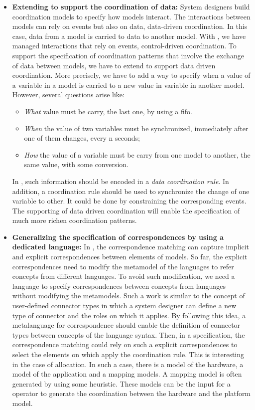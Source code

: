 \begin{itemize}
	\item \textbf{Extending \bcool to support the coordination of data:} System designers build coordination models to specify how models interact. The interactions between models can rely on events but also on data, \ie data-driven coordination. In this case, data from a model is carried to data to another model. With \bcool, we have managed interactions that rely on events, \ie control-driven coordination. To support the specification of coordination patterns that involve the exchange of data between models, we have to extend \bcool to support data driven coordination. More precisely, we have to add a way to specify when a value of a variable in a model is carried to a new value in variable in another model. However, several questions arise like:
			\begin{itemize}
				\item \emph{What} value must be carry, \eg the last one, by using a fifo.
				\item \emph{When} the value of two variables must be synchronized, \eg immediately after one of them changes, every n seconds;
				\item \emph{How} the value of a variable must be carry from one model to another, \eg the same value, with some conversion. 
			\end{itemize}
	In \bcool, such information should be encoded in a \emph{data coordination rule}. In addition, a coordination rule should be used to synchronize the change of one variable to other. It could be done by constraining the corresponding events. The supporting of data driven coordination will enable the specification of much more richen coordination patterns. 	 
	\item \textbf{Generalizing the specification of correspondences by using a dedicated language:} In \bcool, the correspondence matching can capture implicit and explicit correspondences between elements of models. So far, the explicit correspondences need to modify the metamodel of the languages to refer concepts from different languages. To avoid such modification, we need a language to specify correspondences between concepts from languages without modifying the metamodels. Such a work is similar to the concept of user-defined connector types in which a system designer can define a new type of connector and the roles on which it applies. By following this idea, a metalanguage for correspondence should enable the definition of connector types between concepts of the language syntax. Then, in a \bcool specification, the correspondence matching could rely on such a explicit correspondences to select the elements on which apply the coordination rule. This is interesting in the case of allocation. In such a case, there is a model of the hardware, a model of the application and a mapping models. A mapping model is often generated by using some heuristic. These models can be the input for a \bcool operator to generate the coordination between the hardware and the platform model.  

\end{itemize}

